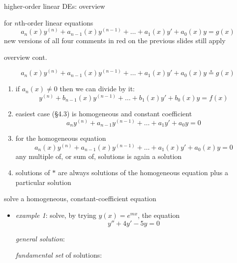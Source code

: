 \documentclass{beamer}
\begin{document}
\begin{frame}{higher-order linear DEs: overview}

for $n$th-order linear equations
\begin{equation*}
    a_n(x) y^{(n)} + a_{n-1}(x) y^{(n-1)} + \dots + a_1(x) y' + a_0(x) y = g(x)
\end{equation*}
\alert{new versions of all four comments in red on the previous slides still apply}
\end{frame}




\begin{frame}{overview cont.}

\begin{equation*}
    a_n(x) y^{(n)} + a_{n-1}(x) y^{(n-1)} + \dots + a_1(x) y' + a_0(x) y \stackrel{\ast}{=} g(x)
\end{equation*}
\begin{enumerate}
\item if $a_n(x)\ne 0$ then we can divide by it:
    $$y^{(n)} + b_{n-1}(x) y^{(n-1)} + \dots + b_1(x) y' + b_0(x) y = f(x)$$
\item easiest case (\S4.3) is homogeneous and constant coefficient
    $$a_n y^{(n)} + a_{n-1} y^{(n-1)} + \dots + a_1 y' + a_0 y = 0$$
\item for the homogeneous equation
\begin{equation*}
    a_n(x) y^{(n)} + a_{n-1}(x) y^{(n-1)} + \dots + a_1(x) y' + a_0(x) y = 0
\end{equation*}
any multiple of, or sum of, solutions is again a solution
\item solutions of $\ast$ are always solutions of the homogeneous equation plus a particular solution
\end{enumerate}
\end{frame}


\begin{frame}{solve a homogeneous, constant-coefficient equation}

\begin{itemize}
\item \emph{example 1}: solve, by trying $y(x)=e^{mx}$, the equation
    $$y'' + 4 y' - 5 y = 0$$

\vspace{40mm}
\small
\noindent \emph{general solution}:

\medskip
\noindent \emph{fundamental set} of solutions:
\end{itemize}
\end{frame}
\end{document}
